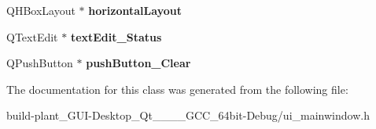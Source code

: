 \begin{DoxyCompactItemize}
\mbox{\label{classUi__MainWindow_acd6fdc9ebacc4b25b834162380d75ce8}} 
Q\+H\+Box\+Layout $\ast$ {\bfseries horizontal\+Layout}
\item 
\mbox{\label{classUi__MainWindow_a8a74b79b459be636a033109819822b14}} 
Q\+Text\+Edit $\ast$ {\bfseries text\+Edit\+\_\+\+Status}
\item 
\mbox{\label{classUi__MainWindow_a19e216ec201bfe58c4256dcc57d6c71f}} 
Q\+Push\+Button $\ast$ {\bfseries push\+Button\+\_\+\+Clear}
\end{DoxyCompactItemize}


The documentation for this class was generated from the following file\+:\begin{DoxyCompactItemize}
\item 
build-\/plant\+\_\+\+G\+U\+I-\/\+Desktop\+\_\+\+Qt\+\_\+\_\+\_\+\_\+\+G\+C\+C\+\_\+64bit-\/\+Debug/ui\+\_\+mainwindow.\+h\end{DoxyCompactItemize}
